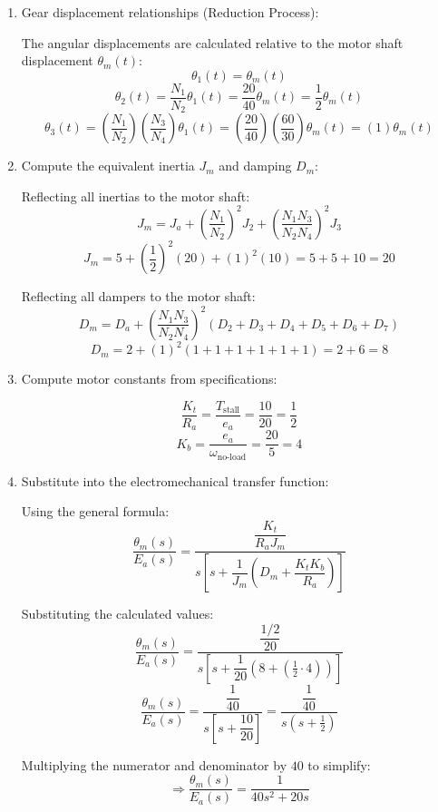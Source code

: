 \documentclass[11pt]{article}
\begin{document}
\begin{enumerate}[label=(\alph*), itemindent=*, leftmargin=*, nolistsep]
    
    \item {Gear displacement relationships (Reduction Process):}
    
    The angular displacements are calculated relative to the motor shaft displacement \(\theta_m(t)\):
    \[
    \theta_1(t) = \theta_m(t)
    \]
    \[
    \theta_2(t) = \frac{N_1}{N_2} \theta_1(t) = \frac{20}{40} \theta_m(t) = \frac{1}{2} \theta_m(t)
    \]
    \[
    \theta_3(t) = \left( \frac{N_1}{N_2} \right) \left( \frac{N_3}{N_4} \right) \theta_1(t) = \left( \frac{20}{40} \right) \left( \frac{60}{30} \right) \theta_m(t) = (1) \theta_m(t)
    \]
    
    \item {Compute the equivalent inertia \( J_m \) and damping \( D_m \):}
    
    Reflecting all inertias to the motor shaft:
    \[
    J_m = J_a + \left( \frac{N_1}{N_2} \right)^2 J_2 + \left( \frac{N_1 N_3}{N_2 N_4} \right)^2 J_3
    \]
    \[
    J_m = 5 + \left( \frac{1}{2} \right)^2 (20) + (1)^2 (10) = 5 + 5 + 10 = \boxed{20}
    \]
    
    Reflecting all dampers to the motor shaft:
    \[
    D_m = D_a + \left( \frac{N_1 N_3}{N_2 N_4} \right)^2 (D_2 + D_3 + D_4 + D_5 + D_6 + D_7)
    \]
    \[
    D_m = 2 + (1)^2 (1 + 1 + 1 + 1 + 1 + 1) = 2 + 6 = \boxed{8}
    \]
    
    \item {Compute motor constants from specifications:}
    
    \[
    \frac{K_t}{R_a} = \frac{T_{\text{stall}}}{e_a} = \frac{10}{20} = \frac{1}{2}
    \]
    \[
    K_b = \frac{e_a}{\omega_{\text{no-load}}} = \frac{20}{5} = 4
    \]
    
    \item {Substitute into the electromechanical transfer function:}
    
    Using the general formula:
    \[
    \frac{\theta_m(s)}{E_a(s)} = \frac{\dfrac{K_t}{R_a J_m}}{s \left[ s + \dfrac{1}{J_m} \left( D_m + \dfrac{K_t K_b}{R_a} \right) \right]}
    \]
    
    Substituting the calculated values:
    \[
    \frac{\theta_m(s)}{E_a(s)} = \frac{\dfrac{1/2}{20}}{s \left[ s + \dfrac{1}{20} \left( 8 + \left( \frac{1}{2} \cdot 4 \right) \right) \right]}
    \]
    \[
    \frac{\theta_m(s)}{E_a(s)} = \frac{\dfrac{1}{40}}{s \left[ s + \dfrac{10}{20} \right]} = \frac{\dfrac{1}{40}}{s \left( s + \frac{1}{2} \right)}
    \]
    
    Multiplying the numerator and denominator by $40$ to simplify:
    \[
    \Rightarrow
    \boxed{
        \frac{\theta_m(s)}{E_a(s)} = \frac{1}{40s^2 + 20s}
    }
    \]
    
\end{enumerate}
\end{document}
